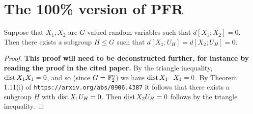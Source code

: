 \chapter{The 100\% version of PFR}

\begin{lemma}\label{lem:100pc}
  Suppose that $X_1,X_2$ are $G$-valued random variables such that
  $d[X_1;X_2]=0$. Then there exists a subgroup $H \leq G$ such that $d[X_1;U_H] = d[X_2;U_H] = 0$.
\end{lemma}

\begin{proof} {\bf This proof will need to be deconstructed further, for instance by reading the proof in the cited paper.}
  By the triangle inequality, $\operatorname{dist}{X_1}{X_1} = 0$, and so (since $G=\mathbb{F}_2^n$) we have $\operatorname{dist}{X_1}{-X_1} = 0$. By Theorem 1.11(i) of {\tt https://arxiv.org/abs/0906.4387} it follows that there exists a subgroup $H$ with $\operatorname{dist}{X_1}{U_H} = 0$.
  Then $\operatorname{dist}{X_2}{U_H}=0$ follows by the triangle inequality.
\end{proof}

